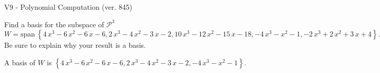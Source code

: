 \begin{exercise}
  \begin{exerciseTitle}V9 - Polynomial Computation (ver. 845)\end{exerciseTitle}
  \begin{exerciseStatement}
    Find a basis for the subspace of \(\mathcal{P}^3\) 
\[W=\mathrm{span}\ \left\{4 \, x^{3} - 6 \, x^{2} - 6 \, x - 6 , 2 \, x^{3} - 4 \, x^{2} - 3 \, x - 2 , 10 \, x^{3} - 12 \, x^{2} - 15 \, x - 18 , -4 \, x^{3} - x^{2} - 1 , -2 \, x^{3} + 2 \, x^{2} + 3 \, x + 4\right\}.\]
 Be sure to explain why your result is a basis.


  \end{exerciseStatement}
  \begin{exerciseAnswer}
   A basis of \(W\) is  \(\left\{4 \, x^{3} - 6 \, x^{2} - 6 \, x - 6 , 2 \, x^{3} - 4 \, x^{2} - 3 \, x - 2 , -4 \, x^{3} - x^{2} - 1\right\}\).
  


  \end{exerciseAnswer}
\end{exercise}